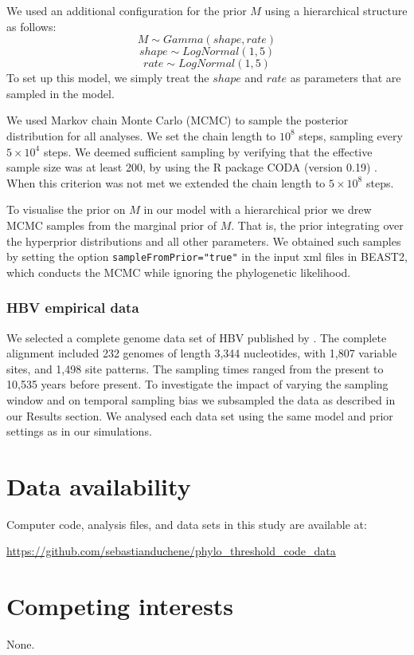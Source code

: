 \documentclass[11pt]{article}
\begin{document}
We used an additional configuration for the prior $M$ using a hierarchical structure as follows:
$$
M \sim Gamma(shape, rate)
$$
$$
shape \sim LogNormal(1, 5)
$$
$$
rate \sim LogNormal(1, 5)
$$
To set up this model, we simply treat the $shape$ and $rate$ as parameters that are sampled in the model. 


We used Markov chain Monte Carlo (MCMC) to sample the posterior distribution for all analyses. We set the chain length to $10^{8}$ steps, sampling every $5\times10^{4}$ steps. We deemed sufficient sampling by verifying that the effective sample size was at least 200, by using the R package CODA (version 0.19) \citep{plummer2006coda}. When this criterion was not met we extended the chain length to $5\times10^{8}$ steps. 

To visualise the prior on $M$ in our model with a hierarchical prior we drew MCMC samples from the marginal prior of $M$. That is, the prior integrating over the hyperprior distributions and all other parameters. We obtained such samples by setting the option \texttt{sampleFromPrior="true"} in the input xml files in BEAST2, which conducts the MCMC while ignoring the phylogenetic likelihood.

\subsubsection{HBV empirical data}
We selected a complete genome data set of HBV published by \cite{kocher2021ten}. The complete alignment included 232 genomes of length 3,344 nucleotides, with 1,807 variable sites, and 1,498 site patterns. The sampling times ranged from the present to 10,535 years before present. To investigate the impact of varying the sampling window and on temporal sampling bias we subsampled the data as described in our Results section. We analysed each data set using the same model and prior settings as in our simulations.

\section{Data availability}
Computer code, analysis files, and data sets in this study are available at:

\url{https://github.com/sebastianduchene/phylo_threshold_code_data}

\section{Competing interests}
None.
\end{document}
